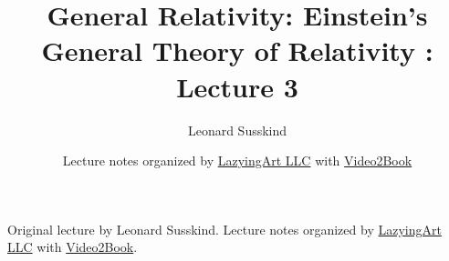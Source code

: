 \documentclass[11pt,oneside]{book}
\begin{document}
\frontmatter
\title{General Relativity: Einstein's General Theory of Relativity : Lecture 3}
\author{Leonard Susskind}
\date{Lecture notes organized by \href{https://lazying.art}{LazyingArt LLC} with \href{https://github.com/lachlanchen/Video2Book}{Video2Book}}
\maketitle
\begin{center}
\small Original lecture by Leonard Susskind. Lecture notes organized by \href{https://lazying.art}{LazyingArt LLC} with \href{https://github.com/lachlanchen/Video2Book}{Video2Book}.
\end{center}
\clearpage
\mainmatter

\end{document}
